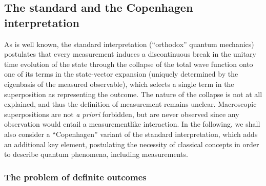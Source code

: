 \documentclass[twocolumn,rmp,aps,amsmath,amsfonts,noshowkeys,noshowpacs]{revtex4}
\begin{document}
\subsection{The standard and the Copenhagen interpretation}

As is well known, the standard interpretation (``orthodox'' quantum
mechanics) postulates that every measurement induces a discontinuous
break in the unitary time evolution of the state through the collapse
of the total wave function onto one of its terms in the state-vector
expansion (uniquely determined by the eigenbasis of the measured
observable), which selects a single term in the superposition as
representing the outcome. The nature of the collapse is not at all
explained, and thus the definition of measurement remains unclear.
Macroscopic superpositions are not \emph{a priori} forbidden, but are
never observed since any observation would entail a measurementlike
interaction. In the following, we shall also consider a ``Copenhagen''
variant of the standard interpretation, which adds an additional key
element, postulating the necessity of classical concepts in order to
describe quantum phenomena, including measurements.


\subsubsection{The problem of definite outcomes}
\end{document}
